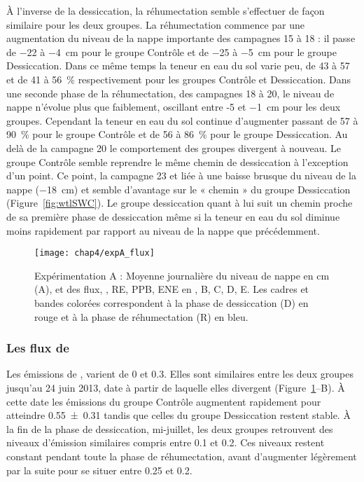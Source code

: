 À l'inverse de la dessiccation, la réhumectation semble s'effectuer de façon similaire pour les deux groupes.
La réhumectation commence par une augmentation du niveau de la nappe importante des campagnes 15 à 18 : il passe de \num{-22} à \SI{-4}{\centi\metre} pour le groupe Contrôle et de \num{-25} à \SI{-5}{\centi\metre} pour le groupe Dessiccation.
Dans ce même temps la teneur en eau du sol varie peu, de 43 à 57 et de 41 à \SI{56}{\percent} respectivement pour les groupes Contrôle et Dessiccation.
Dans une seconde phase de la réhumectation, des campagnes 18 à 20, le niveau de nappe n'évolue plus que faiblement, oscillant entre -5 et \SI{-1}{\centi\metre} pour les deux groupes. 
Cependant la teneur en eau du sol continue d'augmenter passant de 57 à \SI{90}{\percent} pour le groupe Contrôle et de 56 à \SI{86}{\percent} pour le groupe Dessiccation.
Au delà de la campagne 20 le comportement des groupes divergent à nouveau.
Le groupe Contrôle semble reprendre le même chemin de dessiccation à l'exception d'un point.
Ce point, la campagne 23 et liée à une baisse brusque du niveau de la nappe (\SI{-18}{\centi\metre}) et semble d'avantage sur le « chemin » du groupe Dessiccation (Figure~\ref{fig:wtlSWC}).
Le groupe dessiccation quant à lui suit un chemin proche de sa première phase de dessiccation même si la teneur en eau du sol diminue moins rapidement par rapport au niveau de la nappe que précédemment.


\begin{figure}
\centering
\texttt{[image: chap4/expA\_flux]}
\caption{Expérimentation A : Moyenne journalière du niveau de nappe en cm (A), et des flux, \chh, RE, PPB, ENE en \si{\uml}, B, C, D, E. Les cadres et bandes colorées correspondent à la phase de dessiccation (D) en rouge et à la phase de réhumectation (R) en bleu.}
\label{fig:HMzi}
\end{figure}

\subsubsection{Les flux de \chh}

Les émissions de \chh, varient de 0 et \SI{0.3}{\uml}.
Elles sont similaires entre les deux groupes jusqu'au 24 juin 2013, date à partir de laquelle elles divergent (Figure~\ref{fig:HMzi}--B).
À cette date les émissions du groupe Contrôle augmentent rapidement pour atteindre \SI{0.55(031)}{\uml} tandis que celles du groupe Dessiccation restent stable.
À la fin de la phase de dessiccation, mi-juillet, les deux groupes retrouvent des niveaux d'émission similaires compris entre \num{0.1} et \SI{0.2}{\uml}.
Ces niveaux restent constant pendant toute la phase de réhumectation, avant d'augmenter légèrement par la suite pour se situer entre \SI{0.25}{\uml} et \SI{0.2}{\uml}.

